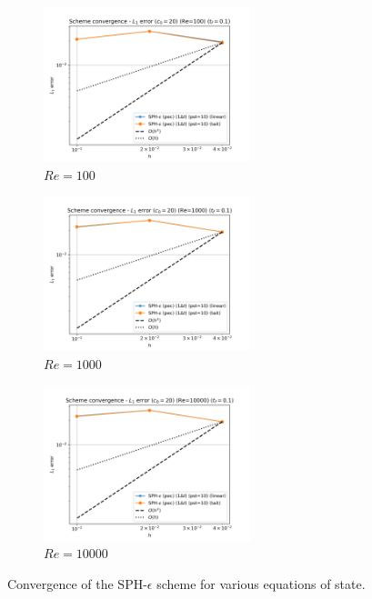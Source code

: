 \begin{figure}[htbp!]
  \begin{subfigure}{7cm}
  \centering\includegraphics[width=6cm]{Code-Figures/mon2017/eos/dt_pois_conv_c0_20_re_100.png}
  \caption{$Re = 100$}
  \end{subfigure}
  \begin{subfigure}{7cm}
  \centering\includegraphics[width=6cm]{Code-Figures/mon2017/eos/dt_pois_conv_c0_20_re_1000.png}
  \caption{$Re = 1000$}
  \end{subfigure}
  \begin{subfigure}{7cm}
  \centering\includegraphics[width=6cm]{Code-Figures/mon2017/eos/dt_pois_conv_c0_20_re_10000.png}
  \caption{$Re = 10000$}
  \end{subfigure}
  \caption{Convergence of the SPH-$\epsilon$ scheme for various equations of state.}
  \label{fig:sph-eps-eos}
\end{figure}

